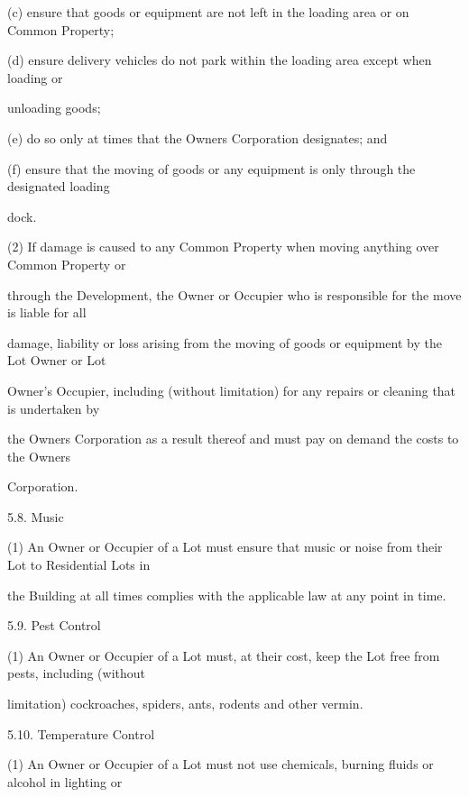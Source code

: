 \documentclass{article}
\begin{document}
{\fontsize{9.962}{1}(c) ensure that goods or equipment are not left in the loading area or on Common Property; }

{\fontsize{9.962}{1}(d) ensure delivery vehicles do not park within the loading area except when loading or }

{\fontsize{10.02}{1}unloading goods; }

{\fontsize{9.962}{1}(e) do so only at times that the Owners Corporation designates; and }

{\fontsize{9.962}{1}(f) ensure that the moving of goods or any equipment is only through the designated loading }

{\fontsize{10.02}{1}dock. }

{\fontsize{9.962}{1}(2) If damage is caused to any Common Property when moving anything over Common Property or }

{\fontsize{10.02}{1}through the Development, the Owner or Occupier who is responsible for the move is liable for all }

{\fontsize{10.02}{1}damage, liability or loss arising from the moving of goods or equipment by the Lot Owner or Lot }

{\fontsize{10.02}{1}Owner’s Occupier, including (without limitation) for any repairs or cleaning that is undertaken by }

{\fontsize{10.02}{1}the Owners Corporation as a result thereof and must pay on demand the costs to the Owners }

{\fontsize{10.02}{1}Corporation. }

{\fontsize{9.99}{1}5.8. Music }

{\fontsize{9.962}{1}(1) An Owner or Occupier of a Lot must ensure that music or noise from their Lot to Residential Lots in }

{\fontsize{10.02}{1}the Building at all times complies with the applicable law at any point in time. }

{\fontsize{9.99}{1}5.9. Pest Control }

{\fontsize{9.962}{1}(1) An Owner or Occupier of a Lot must, at their cost, keep the Lot free from pests, including (without }

{\fontsize{10.02}{1}limitation) cockroaches, spiders, ants, rodents and other vermin. }

{\fontsize{9.99}{1}5.10. Temperature Control }

{\fontsize{9.962}{1}(1) An Owner or Occupier of a Lot must not use chemicals, burning fluids or alcohol in lighting or }
\end{document}
